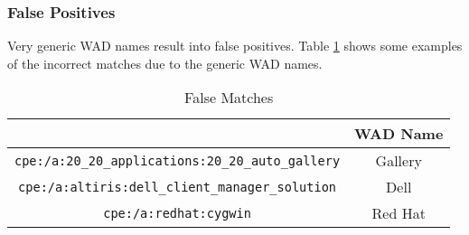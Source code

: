\subsubsection{False Positives}
Very generic WAD names result into false positives. Table \ref{table:false_positives} shows some examples of the incorrect matches due to the generic WAD names. 
\begin{table}
\begin{center}
    \begin{tabular}{ | c | c | }
    
    \hline
	  \hhline{|*2-}
    \multicolumn{1}{|c|}{\cellcolor{LightBlue}\textbf{CPE}} & \multicolumn{1}{|c|}{\cellcolor{LightBlue}\textbf{WAD Name}}  
    \\ \hline
    \texttt{cpe:/a:20\_20\_applications:20\_20\_auto\_gallery} & Gallery
        \\ \hline
    \texttt{cpe:/a:altiris:dell\_client\_manager\_solution} & Dell
        \\ \hline
    \texttt{cpe:/a:redhat:cygwin} & Red Hat
        \\ \hline
    \end{tabular}
    \caption{False Matches}
    \label{table:false_positives}
   \end{center}
\end{table}

